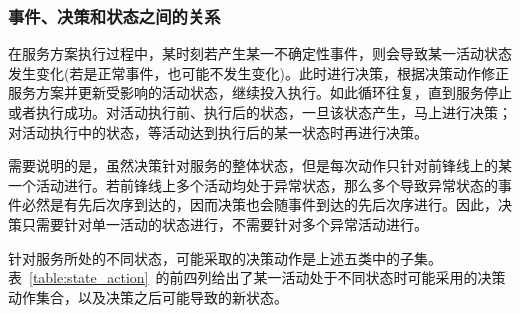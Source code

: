 \subsubsection{事件、决策和状态之间的关系}

在服务方案执行过程中，某时刻若产生某一不确定性事件，则会导致某一活动状态发生变化(若是正常事件，也可能不发生变化)。此时进行决策，根据决策动作修正服务方案并更新受影响的活动状态，继续投入执行。如此循环往复，直到服务停止或者执行成功。对活动执行前、执行后的状态，一旦该状态产生，马上进行决策；对活动执行中的状态，等活动达到执行后的某一状态时再进行决策。

需要说明的是，虽然决策针对服务的整体状态，但是每次动作只针对前锋线上的某一个活动进行。若前锋线上多个活动均处于异常状态，那么多个导致异常状态的事件必然是有先后次序到达的，因而决策也会随事件到达的先后次序进行。因此，决策只需要针对单一活动的状态进行，不需要针对多个异常活动进行。

针对服务所处的不同状态，可能采取的决策动作是上述五类中的子集。表~\ref{table:state_action}~的前四列给出了某一活动处于不同状态时可能采用的决策动作集合，以及决策之后可能导致的新状态。


